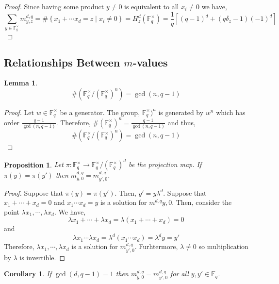 \documentclass{article}
\newcommand{\finfield}[1]{\mathbb{F}_{#1}}
\newcommand{\finunits}[1]{\mathbb{F}_{#1}^\times}
\newtheorem{corollary}{Corollary}[theorem]
\newtheorem{lemma}[theorem]{Lemma}
\newtheorem{proposition}[theorem]{Proposition}
\theoremstyle{definition}
\theoremstyle{definition}
\theoremstyle{remark}
\begin{document}
\begin{proof}
Since having some product $y \neq 0$ is equivalent to all $x_i \neq 0$ we have,
\[ \sum_{y \in \finunits{q}} m^{d,q}_{y,z} = \#\left\{ x_1 + \cdots x_d = z \mid x_i \neq 0 \right\} = H^d_z(\finunits{q}) = \frac{1}{q}\left[ (q-1)^d + (q \delta_z - 1)(-1)^d \right] \]
\end{proof}

\subsection{Relationships Between $m$-values}

\begin{lemma}
\[ \# \left( \finunits{q} / (\finunits{q})^n \right) = \gcd(n, q-1) \] 
\end{lemma}

\begin{proof}
Let $w \in \finunits{q}$ be a generator. The group, $\finunits{q})^n$ is generated by $w^n$ which has order $\frac{q-1}{\gcd(n, q-1)}$. Therefore, $\#(\finunits{q})^n = \frac{q-1}{\gcd(n, q-1)}$ and thus,
\[ \# \left( \finunits{q} / (\finunits{q})^n \right) = \gcd(n, q-1) \]
\end{proof}


\begin{proposition}
Let $\pi : \finunits{q} \to \finunits{q} / (\finunits{q})^d$ be the projection map. If $\pi(y) = \pi(y')$ then $m^{d,q}_{y,0} = m^{d,q}_{y',0}$. 
\end{proposition}

\begin{proof}
Suppose that $\pi(y) = \pi(y')$. Then, $y' = y \lambda^d$. Suppose that $x_1 + \cdots + x_d = 0$ and $x_1 \cdots x_d = y$ is a solution for $m^{d,q}{y,0}$. Then, consider the point $\lambda x_1, \cdots, \lambda x_d$. We have, 
\[ \lambda x_1 + \cdots + \lambda x_d = \lambda (x_1 + \cdots + x_d) = 0 \]
and
\[ \lambda x_1 \cdots \lambda x_d = \lambda^d (x_1 \cdots x_d) = \lambda^d y = y' \]
Therefore, $\lambda x_1, \cdots, \lambda x_d$ is a solution for $m^{d,q}_{y', 0}$. Furhtermore, $\lambda \neq 0$ so multiplication by $\lambda$ is invertible. 
\end{proof}



\begin{corollary}
If $\gcd(d, q-1) = 1$ then $m^{d, q}_{y, 0} = m^{d, q}_{y', 0}$ for all $y, y' \in \finfield{q}$. 
\end{corollary}
\end{document}
